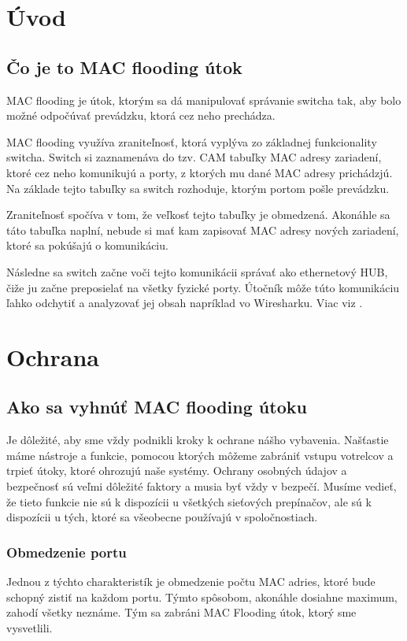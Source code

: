 \chapter{Úvod}
\section{Čo je to MAC flooding útok}
MAC flooding je útok, ktorým sa dá manipulovať správanie switcha tak, aby bolo možné odpočúvať prevádzku, ktorá cez neho prechádza.

MAC flooding využíva zraniteľnosť, ktorá vyplýva zo základnej funkcionality switcha. Switch si zaznamenáva do tzv. CAM tabuľky MAC adresy zariadení, ktoré cez neho komunikujú a porty, z ktorých mu dané MAC adresy prichádzjú. Na základe tejto tabuľky sa switch rozhoduje, ktorým portom pošle prevádzku.

Zraniteľnosť spočíva v tom, že veľkosť tejto tabuľky je obmedzená. Akonáhle sa táto tabuľka naplní, nebude si mať kam zapisovať MAC adresy nových zariadení, ktoré sa pokúšajú o komunikáciu.

Následne sa switch začne voči tejto komunikácii správať ako ethernetový HUB, čiže ju začne preposielať na všetky fyzické porty. Útočník môže túto komunikáciu ľahko odchytiť a analyzovať jej obsah napríklad vo Wiresharku. Viac viz \cite{MACflood}.
\newpage
\chapter{Ochrana}
\section{Ako sa vyhnúť MAC flooding útoku}
Je dôležité, aby sme vždy podnikli kroky k ochrane nášho vybavenia. Našťastie máme nástroje a funkcie, pomocou ktorých môžeme zabrániť vstupu votrelcov a trpieť útoky, ktoré ohrozujú naše systémy. Ochrany osobných údajov a bezpečnosť sú veľmi dôležité faktory a musia byť vždy v bezpečí. Musíme vedieť, že tieto funkcie nie sú k dispozícii u všetkých sieťových prepínačov, ale sú k dispozícii u tých, ktoré sa všeobecne používajú v spoločnostiach.
\subsection{Obmedzenie portu}
Jednou z týchto charakteristík je obmedzenie počtu MAC adries, ktoré bude schopný zistiť na každom portu. Týmto spôsobom, akonáhle dosiahne maximum, zahodí všetky neznáme. Tým sa zabráni MAC Flooding útok, ktorý sme vysvetlili.
